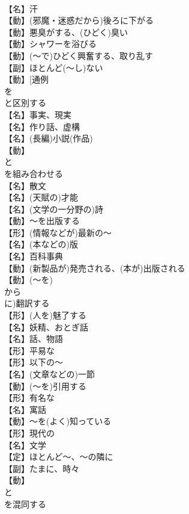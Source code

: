 \documentclass[8pt]{extreport}
\begin{document}
\begin{CJK}{UTF8}{min}
\\	【名】汗
\\	【動】(邪魔・迷惑だから)後ろに下がる
\\	【動】悪臭がする、(ひどく)臭い
\\	【動】シャワーを浴びる
\\	【動】(～で)ひどく興奮する、取り乱す
\\	【副】ほとんど(～し)ない
\\	【動】[通例
\\	を
\\	と区別する
\\	【名】事実、現実
\\	【名】作り話、虚構
\\	【名】(長編)小説(作品)
\\	【動】
\\	と
\\	を組み合わせる
\\	【名】散文
\\	【名】(天賦の)才能
\\	【名】(文学の一分野の)詩
\\	【動】～を出版する
\\	【形】(情報などが)最新の～
\\	【名】(本などの)版
\\	【名】百科事典
\\	【動】(新製品が)発売される、(本が)出版される
\\	【動】(～を)
\\	から
\\	に)翻訳する
\\	【形】(人を)魅了する
\\	【名】妖精、おとぎ話
\\	【名】話、物語
\\	【形】平易な
\\	【形】以下の～
\\	【名】(文章などの)一節
\\	【動】(～を)引用する
\\	【形】有名な
\\	【名】寓話
\\	【動】～を(よく)知っている
\\	【形】現代の
\\	【名】文学
\\	【定】ほとんど～、～の隣に
\\	【副】たまに、時々
\\	【動】
\\	と
\\	を混同する

\end{CJK}
\end{document}
